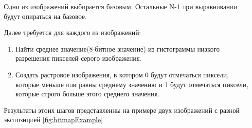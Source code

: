     Одно из изображений выбирается базовым. Остальные N-1 при выравнивании будут опираться на базовое.

    Далее требуется для каждого из изображений:
\begin{enumerate}
    \item Найти среднее значение(8-битное значение) из гистограммы низкого разрешения пикселей серого изображения. 
    \item Создать растровое изображения, в котором 0 будут отмечаться пиксели, которые меньше или равны среднему значению и 1 будут отмечаться пиксели, которые строго больше этого среднего значения.
\end{enumerate}

    Результаты этоих шагов представленны на примере двух изображений с разной экспозицией \ref{fig:bitmapExample}

\begin{figure}[ht!]
\end{figure}

